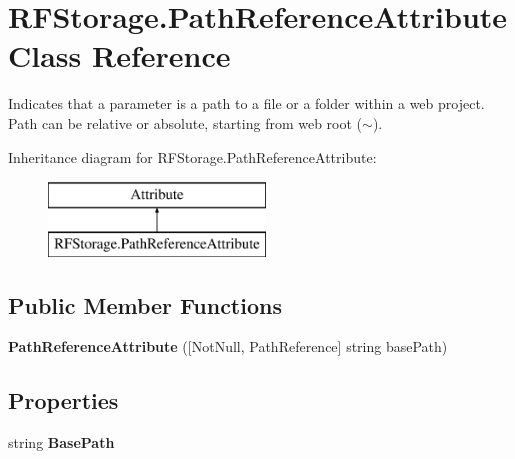 \hypertarget{class_r_f_storage_1_1_path_reference_attribute}{}\section{R\+F\+Storage.\+Path\+Reference\+Attribute Class Reference}
\label{class_r_f_storage_1_1_path_reference_attribute}


Indicates that a parameter is a path to a file or a folder within a web project. Path can be relative or absolute, starting from web root ($\sim$).  


Inheritance diagram for R\+F\+Storage.\+Path\+Reference\+Attribute\+:\begin{figure}[H]
\begin{center}
\leavevmode
\includegraphics[height=2.000000cm]{class_r_f_storage_1_1_path_reference_attribute}
\end{center}
\end{figure}
\subsection*{Public Member Functions}
\begin{DoxyCompactItemize}
\item 
\mbox{\label{class_r_f_storage_1_1_path_reference_attribute_a0dad8573e22d5c87a9ca6a275db0a65f}} 
{\bfseries Path\+Reference\+Attribute} (\mbox{[}Not\+Null, Path\+Reference\mbox{]} string base\+Path)
\end{DoxyCompactItemize}
\subsection*{Properties}
\begin{DoxyCompactItemize}
\item 
\mbox{\label{class_r_f_storage_1_1_path_reference_attribute_a3acded3c6f5486d3cabd009ae62f6f3a}} 
string {\bfseries Base\+Path}
\end{DoxyCompactItemize}


